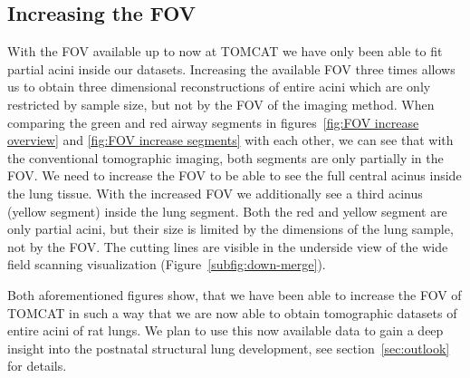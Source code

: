 \subsection{Increasing the FOV}
With the FOV available up to now at TOMCAT we have only been able to fit partial acini inside our datasets. Increasing the available FOV three times allows us to obtain three dimensional reconstructions of entire acini which are only restricted by sample size, but not by the FOV of the imaging method. When comparing the green and red airway segments in figures~\ref{fig:FOV increase overview} and \ref{fig:FOV increase segments} with each other, we can see that with the conventional tomographic imaging, both segments are only partially in the FOV. We need to increase the FOV to be able to see the full central acinus inside the lung tissue. With the increased FOV we additionally see a third acinus (yellow segment) inside the lung segment. Both the red and yellow segment are only partial acini, but their size is limited by the dimensions of the lung sample, not by the FOV. The cutting lines are visible in the underside view of the wide field scanning visualization (Figure~\ref{subfig:down-merge}).

Both aforementioned figures show, that we have been able to increase the FOV of TOMCAT in such a way that we are now able to obtain tomographic datasets of entire acini of rat lungs. We plan to use this now available data to gain a deep insight into the postnatal structural lung development, see section~\ref{sec:outlook} for details.

